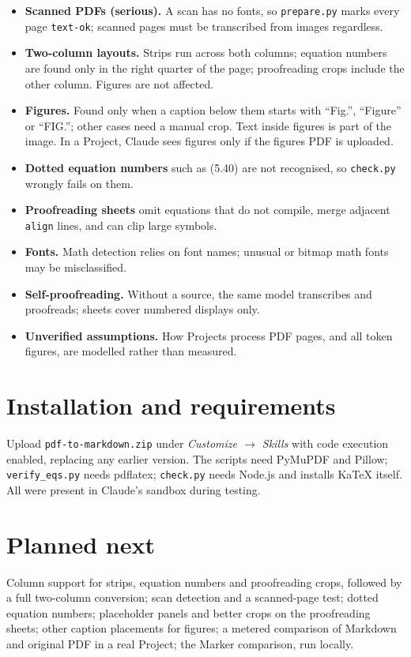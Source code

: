 \documentclass[11pt]{article}
\newcommand{\file}[1]{\texttt{#1}}
\begin{document}
\begin{itemize}
\item \textbf{Scanned PDFs (serious).} A scan has no fonts, so \file{prepare.py}
  marks every page \texttt{text-ok}; scanned pages must be transcribed from
  images regardless.
\item \textbf{Two-column layouts.} Strips run across both columns; equation
  numbers are found only in the right quarter of the page; proofreading crops
  include the other column. Figures are not affected.
\item \textbf{Figures.} Found only when a caption below them starts with
  ``Fig.'', ``Figure'' or ``FIG.''; other cases need a manual crop. Text inside
  figures is part of the image. In a Project, Claude sees figures only if the
  figures PDF is uploaded.
\item \textbf{Dotted equation numbers} such as (5.40) are not recognised, so
  \file{check.py} wrongly fails on them.
\item \textbf{Proofreading sheets} omit equations that do not compile, merge
  adjacent \texttt{align} lines, and can clip large symbols.
\item \textbf{Fonts.} Math detection relies on font names; unusual or bitmap
  math fonts may be misclassified.
\item \textbf{Self-proofreading.} Without a source, the same model transcribes
  and proofreads; sheets cover numbered displays only.
\item \textbf{Unverified assumptions.} How Projects process PDF pages, and all
  token figures, are modelled rather than measured.
\end{itemize}

\section{Installation and requirements}

Upload \file{pdf-to-markdown.zip} under \emph{Customize $\rightarrow$ Skills} with
code execution enabled, replacing any earlier version. The scripts need PyMuPDF
and Pillow; \file{verify\_eqs.py} needs pdflatex; \file{check.py} needs Node.js and
installs KaTeX itself. All were present in Claude's sandbox during testing.

\section{Planned next}

Column support for strips, equation numbers and proofreading crops, followed by
a full two-column conversion; scan detection and a scanned-page test; dotted
equation numbers; placeholder panels and better crops on the proofreading
sheets; other caption placements for figures; a metered comparison of Markdown
and original PDF in a real Project; the Marker comparison, run locally.
\end{document}
